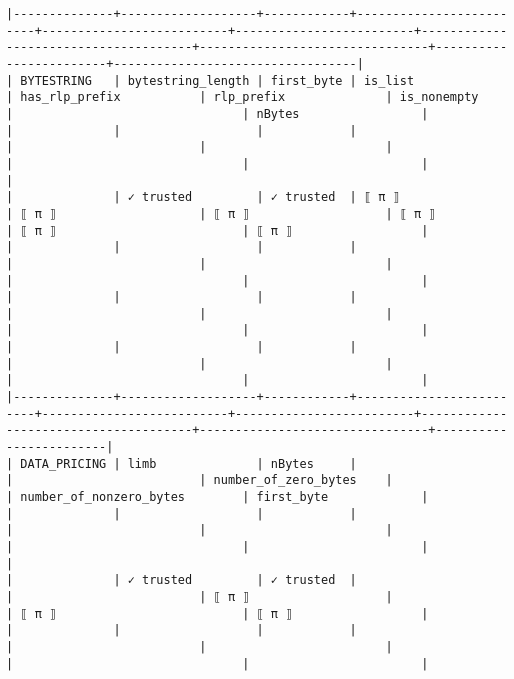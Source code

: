 \documentclass[varwidth=\maxdimen,margin=0.5cm,multi={verbatim}]{standalone}
\begin{document}
\begin{verbatim}
|--------------+-------------------+------------+-------------------------+--------------------------+-------------------------+--------------------------------------+--------------------------------+------------------------+----------------------------------|
| BYTESTRING   | bytestring_length | first_byte | is_list                 | has_rlp_prefix           | rlp_prefix              | is_nonempty                          |                                | nBytes                 |
|              |                   |            |                         |                          |                         |                                      |                                |                        |                                  |
|              | ✓ trusted         | ✓ trusted  | ⟦ π ⟧                   | ⟦ π ⟧                    | ⟦ π ⟧                   | ⟦ π ⟧                                | ⟦ π ⟧                          | ⟦ π ⟧                  |
|              |                   |            |                         |                          |                         |                                      |                                |                        |
|              |                   |            |                         |                          |                         |                                      |                                |                        |
|              |                   |            |                         |                          |                         |                                      |                                |                        |
|--------------+-------------------+------------+-------------------------+--------------------------+-------------------------+--------------------------------------+--------------------------------+------------------------|
| DATA_PRICING | limb              | nBytes     |                         |                          | number_of_zero_bytes    |                                      | number_of_nonzero_bytes        | first_byte             |
|              |                   |            |                         |                          |                         |                                      |                                |                        |                                  |
|              | ✓ trusted         | ✓ trusted  |                         |                          | ⟦ π ⟧                   |                                      | ⟦ π ⟧                          | ⟦ π ⟧                  |
|              |                   |            |                         |                          |                         |                                      |                                |                        |

\end{verbatim}
\end{document}
